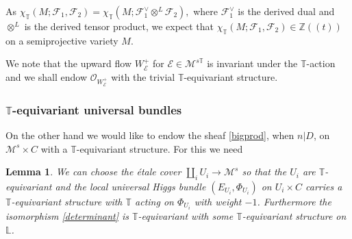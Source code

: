 \documentclass[12pt]{article}
\numberwithin{equation}{section}
\newtheorem{lemma}[theorem]{Lemma}
\theoremstyle{remark}
\theoremstyle{definition}
\numberwithin{theorem}{section}
\def\calE{{\mathcal E}}
\def\bPhi{{\mathbb{\Phi}}}
\def\L{\mathbb{L}}
\def\M{{\mathcal{M}}}
\def\calF{{\mathcal{F}}}
\newcommand{\T}{{\mathbb{T}}}
\def\calO{{\mathcal O}}
\def\Z{\mathbb{Z}}
\renewcommand{\1}{\mathbbm{1}}
\begin{document}
As $\chi_\T(M;\calF_1,\calF_2)=\chi_\T(M;\calF_1^\vee\otimes^L\calF_2),$ where $\calF_1^\vee$ is the derived dual and $\otimes^L$ is the derived tensor product, we expect that  $\chi_\T(M;\calF_1,\calF_2)\in \Z((t))$ on a semiprojective variety $M$.

We note that the upward flow $W^+_\calE$ for $\calE\in \M^{s\T}$ is invariant under the $\T$-action and we shall endow $\calO_{W^+_\calE}$  with the trivial $\T$-equivariant structure. 
\subsubsection{$\T$-equivariant universal bundles}
\label{equiuni}
On the other hand we would like to endow the  sheaf \eqref{bigprod}, when $n|D$,  on $\M^s\times C$ with a $\T$-equivariant structure. For this we need

\begin{lemma} \label{teqcover} We can choose the \'etale cover $\coprod_i U_i\to \M^s$ so that the $U_i$ are $\T$-equivariant and  the local universal Higgs bundle  $(E_{U_i},\bPhi_{U_i})$ on $U_i\times C$ carries a $\T$-equivariant structure with $\T$ acting on $\bPhi_{U_i}$ with weight $-1$. Furthermore the isomorphism \eqref{determinant} is $\T$-equivariant with some $\T$-equivariant structure on $\L$.
\end{lemma}
\end{document}
